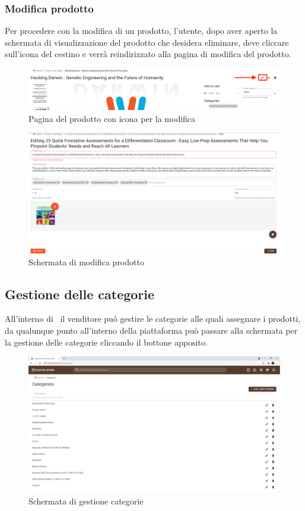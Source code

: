 \subsubsection{Modifica prodotto}
Per procedere con la modifica di un prodotto, l'utente, dopo aver aperto la schermata di visualizzazione del prodotto che desidera eliminare, deve cliccare sull'icona del cestino e verrà reindirizzato alla pagina di modifica del prodotto.
\begin{figure}[H]
	\centering
	\includegraphics[scale=0.25]{Immagini/Venditore/pdp.sellermodify.png}
	\caption{Pagina del prodotto con icona per la modifica}
	\label{fig:ModificaP}
\end{figure}
\begin{figure}[H]
	\centering
	\includegraphics[scale=0.25]{Immagini/Venditore/pdp-edit.seller.png}
	\caption{Schermata di modifica prodotto}
	\label{fig:ModificaProdotto}
\end{figure}
\subsection{Gestione delle categorie}\label{categorie}
All'interno di \NomeProgetto\ il venditore può gestire le categorie alle quali assegnare i prodotti, da qualunque punto all'interno della piattaforma può passare alla schermata per la gestione delle categorie cliccando il bottone apposito.
\begin{figure}[H]
	\centering
	\includegraphics[scale=0.4]{Immagini/Venditore/categories.png}
	\caption{Schermata di gestione categorie}
	\label{fig:GestioneCategorie}
\end{figure}
